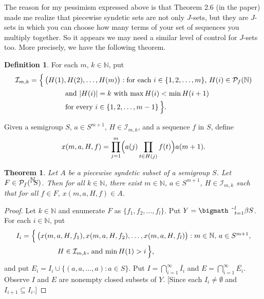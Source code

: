 \documentclass[12pt]{letter}
\theoremstyle{plain}
\newtheorem*{thm}{Theorem}
\theoremstyle{definition}
\newtheorem*{defn}{Definition}
\newcommand{\bbN}{\mathbb{N}}
\newcommand{\calI}{\mathcal{I}}
\newcommand{\Pf}{\mathcal{P}_f}
\newcommand{\setfunc}[2]{\hbox{${}^{\hbox{$#1$}}\hskip -3 pt #2$}}
\newcommand{\bigtimes}{\hbox{\bigmath \char'2}}
\begin{document}
\begin{letter}{}
The reason for my pessimism expressed above is that Theorem 2.6 (in
the paper) made me realize that piecewise syndetic sets are not only
$J$-sets, but they are $J$-sets in which you can choose how many terms of
your set of sequences you multiply together.
So it appears we may need a similar level of control for $J$-sets too.
More precisely, we have the following theorem.

\begin{defn}
  For each $m$, $k \in \bbN$, put
  \begin{align*}
    \calI_{m,k} &= \Bigl\{\, \bigl(H(1), H(2), \ldots, H(m)\bigr) :
    \mbox{for each $i \in \{1, 2, \ldots, m\}$, $H(i) \in \Pf(\bbN)$}
    \\
    &\hspace{5em}\mbox{and $|H(i)| = k$ with $\max H(i) < \min
      H(i+1)$}\\
    &\hspace{5em}\mbox{for every $i \in \{1, 2, \ldots, m-1\}$} \,\Bigr\}.
  \end{align*}

  Given a semigroup $S$, $a \in S^{m+1}$, $H \in \calI_{m,k}$, and a
  sequence $f$ in $S$, define
  \[
    x(m, a, H, f) = \prod_{j=1}^m\Bigl( a(j)\prod_{t \in H(j)} f(t)
    \Bigr) a(m+1).
  \]
\end{defn}

\begin{thm}
  Let $A$ be a piecewise syndetic subset of a semigroup $S$. 
  Let $F \in \Pf(\setfunc{\bbN}{S})$.
  Then for all $k \in \bbN$, there exist $m \in \bbN$, $a \in
  S^{m+1}$, $H \in \calI_{m,k}$ such that for all $f \in F$, $x(m, a,
  H, f) \in A$.
\end{thm}
\begin{proof}
  Let $k \in \bbN$ and enumerate $F$ as $\{f_1, f_2, \ldots, f_l \}$.
  Put $Y = \bigtimes_{t=1}^l \beta S$.
  For each $i \in \bbN$, put
  \begin{align*}
    I_i &= \Bigl\{\, \bigl( x(m, a, H, f_1), x(m, a, H, f_2), \ldots,
    x(m, a, H, f_l) \bigr) : \mbox{$m \in \bbN$, $a \in S^{m+1}$,} \\
    &\hspace{5em} \mbox{$H \in \calI_{m,k}$, and $\min H(1) > i$}
    \,\Bigr\},
  \end{align*}
  and put $E_i = I_i \cup \{(a, a, \ldots, a) : a \in S\}$.
  Put $I = \bigcap_{i=1}^\infty \overline{I_i}$ and $E =
  \bigcap_{i=1}^\infty \overline{E_i}$.
  Observe $I$ and $E$ are nonempty closed subsets of $Y$.
  [Since each $I_i \ne \emptyset$ and $I_{i+1} \subseteq I_i$.]
  

\end{proof}
\end{letter}
\end{document}
